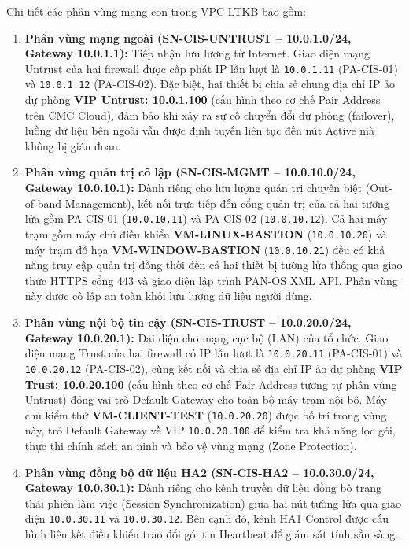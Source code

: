 \documentclass[12pt,a4paper]{article}
\begin{document}
\noindent Chi tiết các phân vùng mạng con trong VPC-LTKB bao gồm:
\begin{enumerate}
    \item \textbf{Phân vùng mạng ngoài (SN-CIS-UNTRUST -- 10.0.1.0/24, Gateway 10.0.1.1):} Tiếp nhận lưu lượng từ Internet. Giao diện mạng Untrust của hai firewall được cấp phát IP lần lượt là \texttt{10.0.1.11} (PA-CIS-01) và \texttt{10.0.1.12} (PA-CIS-02). Đặc biệt, hai thiết bị chia sẻ chung địa chỉ IP ảo dự phòng \textbf{VIP Untrust: 10.0.1.100} (cấu hình theo cơ chế Pair Address trên CMC Cloud), đảm bảo khi xảy ra sự cố chuyển đổi dự phòng (failover), luồng dữ liệu bên ngoài vẫn được định tuyến liên tục đến nút Active mà không bị gián đoạn.
    \item \textbf{Phân vùng quản trị cô lập (SN-CIS-MGMT -- 10.0.10.0/24, Gateway 10.0.10.1):} Dành riêng cho lưu lượng quản trị chuyên biệt (Out-of-band Management), kết nối trực tiếp đến cổng quản trị của cả hai tường lửa gồm PA-CIS-01 (\texttt{10.0.10.11}) và PA-CIS-02 (\texttt{10.0.10.12}). Cả hai máy trạm gồm máy chủ điều khiển \textbf{VM-LINUX-BASTION} (\texttt{10.0.10.20}) và máy trạm đồ họa \textbf{VM-WINDOW-BASTION} (\texttt{10.0.10.21}) đều có khả năng truy cập quản trị đồng thời đến cả hai thiết bị tường lửa thông qua giao thức HTTPS cổng 443 và giao diện lập trình PAN-OS XML API. Phân vùng này được cô lập an toàn khỏi lưu lượng dữ liệu người dùng.
    \item \textbf{Phân vùng nội bộ tin cậy (SN-CIS-TRUST -- 10.0.20.0/24, Gateway 10.0.20.1):} Đại diện cho mạng cục bộ (LAN) của tổ chức. Giao diện mạng Trust của hai firewall có IP lần lượt là \texttt{10.0.20.11} (PA-CIS-01) và \texttt{10.0.20.12} (PA-CIS-02), cùng kết nối và chia sẻ địa chỉ IP ảo dự phòng \textbf{VIP Trust: 10.0.20.100} (cấu hình theo cơ chế Pair Address tương tự phân vùng Untrust) đóng vai trò Default Gateway cho toàn bộ máy trạm nội bộ. Máy chủ kiểm thử \textbf{VM-CLIENT-TEST} (\texttt{10.0.20.20}) được bố trí trong vùng này, trỏ Default Gateway về VIP \texttt{10.0.20.100} để kiểm tra khả năng lọc gói, thực thi chính sách an ninh và bảo vệ vùng mạng (Zone Protection).
    \item \textbf{Phân vùng đồng bộ dữ liệu HA2 (SN-CIS-HA2 -- 10.0.30.0/24, Gateway 10.0.30.1):} Dành riêng cho kênh truyền dữ liệu đồng bộ trạng thái phiên làm việc (Session Synchronization) giữa hai nút tường lửa qua giao diện \texttt{10.0.30.11} và \texttt{10.0.30.12}. Bên cạnh đó, kênh HA1 Control được cấu hình liên kết điều khiển trao đổi gói tin Heartbeat để giám sát tính sẵn sàng.
\end{enumerate}
\end{document}
